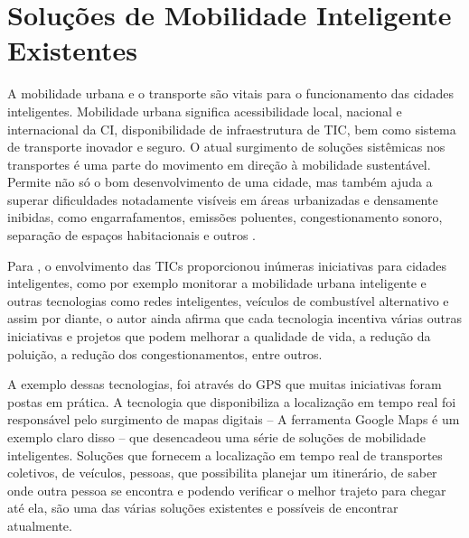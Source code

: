 %
%


						
\chapter{Soluções de Mobilidade Inteligente Existentes}\label{chap:Soluções Existentes} 
%



A mobilidade urbana e o transporte são vitais para o funcionamento das cidades inteligentes. Mobilidade urbana significa acessibilidade local, nacional e internacional da CI, disponibilidade de infraestrutura de TIC, bem como sistema de transporte inovador e seguro.  O atual surgimento de soluções sistêmicas nos transportes é uma parte do movimento em direção à mobilidade sustentável. Permite não só o bom desenvolvimento de uma cidade, mas também ajuda a superar dificuldades notadamente visíveis em áreas urbanizadas e densamente inibidas, como engarrafamentos, emissões poluentes, congestionamento sonoro, separação de espaços habitacionais e outros \cite{opitek}.

Para , o envolvimento das TICs proporcionou inúmeras iniciativas para cidades inteligentes, como por exemplo monitorar a mobilidade urbana inteligente e outras tecnologias como redes inteligentes, veículos de combustível alternativo e assim por diante, o autor ainda afirma que cada tecnologia incentiva várias outras iniciativas e projetos que podem melhorar a qualidade de vida, a redução da poluição, a redução dos congestionamentos, entre outros.

A exemplo dessas tecnologias, foi através do GPS que muitas iniciativas foram postas em prática. A tecnologia  que disponibiliza a localização em tempo real foi responsável pelo surgimento de mapas digitais -- A ferramenta Google Maps é um exemplo claro disso -- que desencadeou uma série de soluções de mobilidade inteligentes. Soluções que fornecem a localização em tempo real de transportes coletivos, de veículos, pessoas, que possibilita planejar um itinerário, de saber onde outra pessoa se encontra e podendo verificar o melhor trajeto para chegar até ela, são uma das várias soluções existentes e possíveis de encontrar atualmente.

